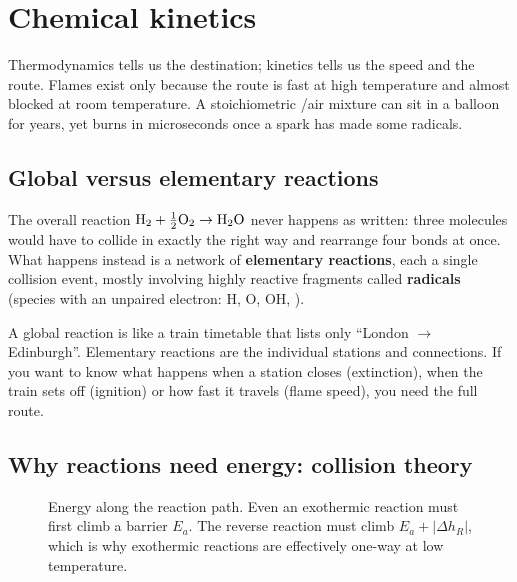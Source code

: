 \chapter{Chemical kinetics}
\label{ch:kinetics}

Thermodynamics tells us the destination; kinetics tells us the speed and the route. Flames exist
only because the route is fast at high temperature and almost blocked at room temperature.
A stoichiometric /air mixture can sit in a balloon for years, yet burns in microseconds once
a spark has made some radicals.

\section{Global versus elementary reactions}

The overall reaction $\mathrm{H_2}+\tfrac12\mathrm{O_2}\to\mathrm{H_2O}$ never happens as written: three
molecules would have to collide in exactly the right way and rearrange four bonds at once. What
happens instead is a network of \textbf{elementary reactions}, each a single collision event,
mostly involving highly reactive fragments called \textbf{radicals} (species with an unpaired
electron: H, O, OH, ).

\begin{intuition}
A global reaction is like a train timetable that lists only ``London $\to$ Edinburgh''. Elementary
reactions are the individual stations and connections. If you want to know what happens when a
station closes (extinction), when the train sets off (ignition) or how fast it travels (flame
speed), you need the full route.
\end{intuition}

\section{Why reactions need energy: collision theory}
\label{sec:collision}

\begin{figure}[H]
\centering
{}
\caption{Energy along the reaction path. Even an exothermic reaction must first climb a barrier
$E_a$. The reverse reaction must climb $E_a+|\Delta h_R|$, which is why exothermic reactions are
effectively one-way at low temperature.}
\label{fig:barrier}
\end{figure}

